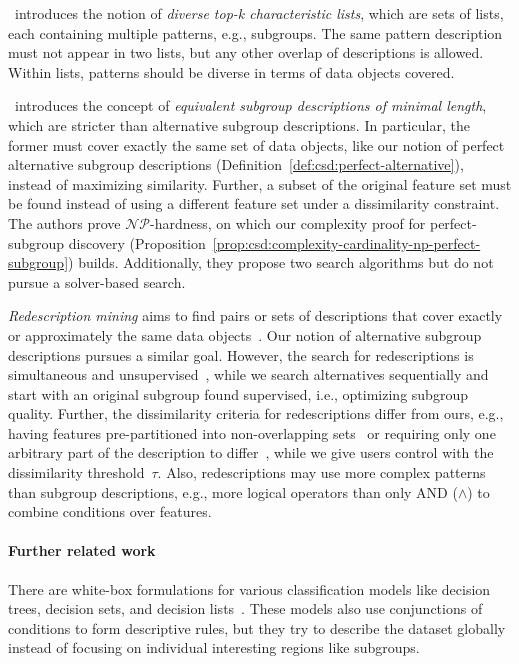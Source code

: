 \documentclass[acmsmall]{acmart} %
\theoremstyle{acmplain}
\theoremstyle{acmdefinition}
\begin{document}
\cite{lopez2023discovering}~introduces the notion of \emph{diverse top-k characteristic lists}, which are sets of lists, each containing multiple patterns, e.g., subgroups.
The same pattern description must not appear in two lists, but any other overlap of descriptions is allowed.
Within lists, patterns should be diverse in terms of data objects covered.

\cite{boley2009non}~introduces the concept of \emph{equivalent subgroup descriptions of minimal length}, which are stricter than alternative subgroup descriptions.
In particular, the former must cover exactly the same set of data objects, like our notion of perfect alternative subgroup descriptions (Definition~\ref{def:csd:perfect-alternative}), instead of maximizing similarity.
Further, a subset of the original feature set must be found instead of using a different feature set under a dissimilarity constraint.
The authors prove $\mathcal{NP}$-hardness, on which our complexity proof for perfect-subgroup discovery (Proposition~\ref{prop:csd:complexity-cardinality-np-perfect-subgroup}) builds.
Additionally, they propose two search algorithms but do not pursue a solver-based search.

\emph{Redescription mining} aims to find pairs or sets of descriptions that cover exactly or approximately the same data objects~\cite{galbrun2017redescription, ramakrishnan2004turning}.
Our notion of alternative subgroup descriptions pursues a similar goal.
However, the search for redescriptions is simultaneous and unsupervised~\cite{ramakrishnan2004turning}, while we search alternatives sequentially and start with an original subgroup found supervised, i.e., optimizing subgroup quality.
Further, the dissimilarity criteria for redescriptions differ from ours, e.g., having features pre-partitioned into non-overlapping sets~\cite{galbrun2017redescription, gallo2008finding, mihelcic2023complexity} or
requiring only one arbitrary part of the description to differ~\cite{parida2005redescription}, while we give users control with the dissimilarity threshold~$\tau$.
Also, redescriptions may use more complex patterns than subgroup descriptions, e.g., more logical operators than only AND ($\land$) to combine conditions over features.

\paragraph{Further related work}

There are white-box formulations for various classification models like decision trees, decision sets, and decision lists~\cite{ignatiev2021reasoning, narodytska2018learning, shati2021sat, yu2021learning}.
These models also use conjunctions of conditions to form descriptive rules, but they try to describe the dataset globally instead of focusing on individual interesting regions like subgroups.
\end{document}
